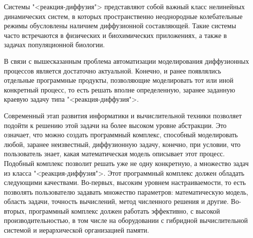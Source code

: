 \documentclass[a4paper, 14pt]{extarticle}
\theoremstyle{definition}
\begin{document}
\par Системы "<реакция-диффузия"> представляют собой важный класс нелинейных динамических систем, в которых пространственно неоднородные колебательные режимы обусловлены наличием диффузионной составляющей. Такие системы часто встречаются в физических и биохимических приложениях, а также в задачах популяционной биологии.



\par В связи с вышесказанным проблема автоматизации моделирования диффузионных процессов является достаточно актуальной. Конечно, и ранее появлялись отдельные программные продукты, позволяющие моделировать тот или иной конкретный процесс, то есть решать вполне определенную, заранее заданную краевую задачу типа "<реакция-диффузия">.

\par Современный этап развития информатики и вычислительной техники позволяет подойти к решению этой задачи на более высоком уровне абстракции. Это означает, что можно создать программный комплекс, способный моделировать любой, заранее неизвестный, диффузионную задачу, конечно, при условии, что пользователь знает, какая математическая модель описывает этот процесс. Подобный комплекс позволит решать уже не одну конкретную, а множество задач из класса "<реакция-диффузия">. Этот программный комплекс должен обладать следующими качествами. Во-первых, высоким уровнем настраиваемости, то есть позволять пользователю задавать множество параметров: математическую модель, область задачи, точность вычислений, метод численного решения и другие. Во-вторых, программный комплекс должен работать эффективно, с высокой производительностью, в том числе на оборудовании с гибридной вычислительной системой и иерархической организацией памяти.
\end{document}
